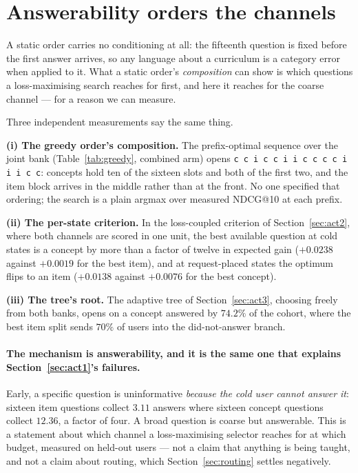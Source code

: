 \documentclass[11pt]{article}
\begin{document}
\section{Answerability orders the channels}
\label{sec:act4}

A static order carries no conditioning at all: the fifteenth question is fixed
before the first answer arrives, so any language about a curriculum is a category error when applied
to it. What a static order's \emph{composition} can show is which questions a loss-maximising search
reaches for first, and here it reaches for the coarse channel --- for a reason we can measure.

Three independent measurements say the same thing.

\textbf{(i) The greedy order's composition.} The prefix-optimal sequence over the joint bank
(Table~\ref{tab:greedy}, combined arm) opens \texttt{c\,c\,i\,c\,c\,i\,i\,c\,c\,c\,c\,i\,i\,i\,c\,c}:
concepts hold ten of the sixteen slots and both of the first two, and the item block arrives in the
middle rather than at the front. No one specified that ordering; the search is a plain argmax over
measured NDCG@10 at each prefix.

\textbf{(ii) The per-state criterion.} In the loss-coupled criterion of Section~\ref{sec:act2},
where both channels are scored in one unit, the best available question at cold states is a concept
by more than a factor of twelve in expected gain ($+0.0238$ against $+0.0019$ for the best item), and
at request-placed states the optimum flips to an item ($+0.0138$ against $+0.0076$ for the best
concept).

\textbf{(iii) The tree's root.} The adaptive tree of Section~\ref{sec:act3}, choosing freely from
both banks, opens on a concept answered by $74.2\%$ of the cohort, where the best item split sends
$70\%$ of users into the did-not-answer branch.

\paragraph{The mechanism is answerability, and it is the same one that explains Section~\ref{sec:act1}'s failures.}
Early, a specific question is uninformative \emph{because the cold user cannot answer it}: sixteen
item questions collect $3.11$ answers where sixteen concept questions collect $12.36$, a factor of
four. A broad question is coarse but answerable. This is a statement about which channel a
loss-maximising selector reaches for at which budget, measured on held-out users --- not a claim that
anything is being taught, and not a claim about routing, which Section~\ref{sec:routing} settles
negatively.
\end{document}
